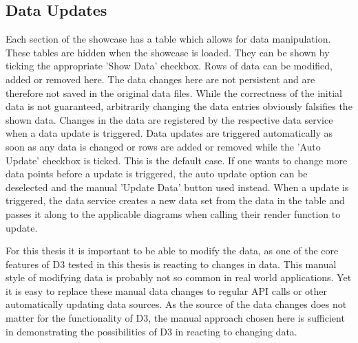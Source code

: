 \subsection{Data Updates}

Each section of the showcase has a table which allows for data manipulation. These tables are hidden when the showcase is loaded. They can be shown by ticking the appropriate 'Show Data' checkbox. Rows of data can be modified, added or removed here. The data changes here are not persistent and are therefore not saved in the original data files. While the correctness of the initial data is not guaranteed, arbitrarily changing the data entries obviously falsifies the shown data. Changes in the data are registered by the respective data service when a data update is triggered. Data updates are triggered automatically as soon as any data is changed or rows are added or removed while the 'Auto Update' checkbox is ticked. This is the default case. If one wants to change more data points before a update is triggered, the auto update option can be deselected and the manual 'Update Data' button used instead. When a update is triggered, the data service creates a new data set from the data in the table and passes it along to the applicable diagrams when calling their render function to update.

For this thesis it is important to be able to modify the data, as one of the core features of D3 tested in this thesis is reacting to changes in data. This manual style of modifying data is probably not so common in real world applications. Yet it is easy to replace these manual data changes to regular API calls or other automatically updating data sources. As the source of the data changes does not matter for the functionality of D3, the manual approach chosen here is sufficient in demonstrating the possibilities of D3 in reacting to changing data.
